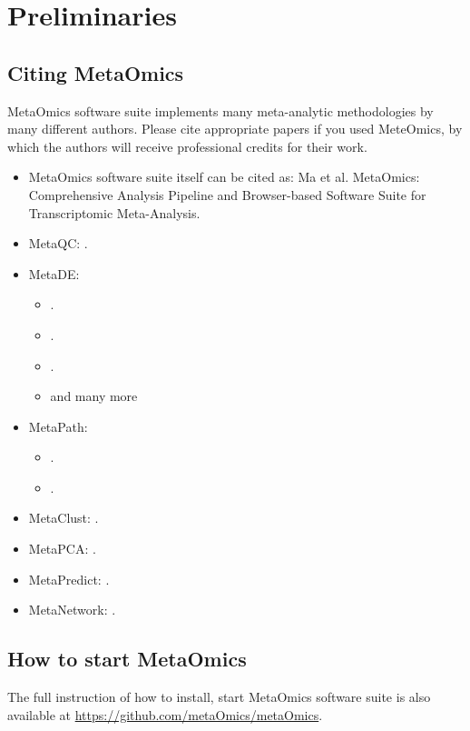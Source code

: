 \section{Preliminaries}
\subsection{Citing MetaOmics}
MetaOmics software suite implements many meta-analytic methodologies by many different authors. 
Please cite appropriate papers if you used MeteOmics,
by which the authors will receive professional credits for their work.

\begin{itemize}
\item MetaOmics software suite  itself can be cited as: Ma et al. MetaOmics: Comprehensive Analysis Pipeline and Browser-based Software Suite for Transcriptomic Meta-Analysis.
\item MetaQC: .
\item MetaDE: 
\begin{itemize}
\item {}.
\item {}.
\item {}.
\item and many more
\end{itemize}
\item MetaPath: 
\begin{itemize}
\item {}.
\item {}.
\end{itemize}
\item MetaClust: .
\item MetaPCA: .
\item MetaPredict: .
\item MetaNetwork: .
\end{itemize}



\subsection{How to start MetaOmics}

The full instruction of how to install, start MetaOmics software suite is also available at \url{https://github.com/metaOmics/metaOmics}.


